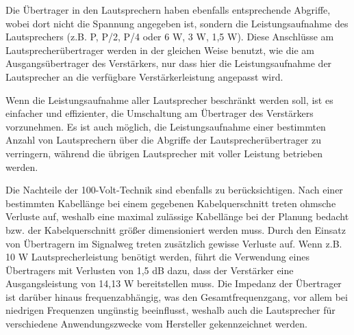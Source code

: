 Die Übertrager in den Lautsprechern haben ebenfalls entsprechende Abgriffe, wobei dort nicht die Spannung angegeben ist, sondern die Leistungsaufnahme des Lautsprechers (z.B. P, P/2, P/4 oder 6 W, 3 W, 1,5 W). Diese Anschlüsse am Lautsprecherübertrager werden in der gleichen Weise benutzt, wie die am Ausgangsübertrager des Verstärkers, nur dass hier die Leistungsaufnahme der Lautsprecher an die verfügbare Verstärkerleistung angepasst wird.

Wenn die Leistungsaufnahme aller Lautsprecher beschränkt werden soll, ist es einfacher und effizienter, die Umschaltung am Übertrager des Verstärkers vorzunehmen. Es ist auch möglich, die Leistungsaufnahme einer bestimmten Anzahl von Lautsprechern über die Abgriffe der Lautsprecherübertrager zu verringern, während die übrigen Lautsprecher mit voller Leistung betrieben werden.

Die Nachteile der 100-Volt-Technik sind ebenfalls zu berücksichtigen. Nach einer bestimmten Kabellänge bei einem gegebenen Kabelquerschnitt treten ohmsche Verluste auf, weshalb eine maximal zulässige Kabellänge bei der Planung bedacht bzw. der Kabelquerschnitt größer dimensioniert werden muss. Durch den Einsatz von Übertragern im Signalweg treten zusätzlich gewisse Verluste auf. Wenn z.B. 10 W Lautsprecherleistung benötigt werden, führt die Verwendung eines Übertragers mit Verlusten von 1,5 dB dazu, dass der Verstärker eine Ausgangsleistung von 14,13 W bereitstellen muss. Die Impedanz der Übertrager ist darüber hinaus frequenzabhängig, was den Gesamtfrequenzgang, vor allem bei niedrigen Frequenzen ungünstig beeinflusst, weshalb auch die Lautsprecher für verschiedene Anwendungszwecke vom Hersteller gekennzeichnet werden.

